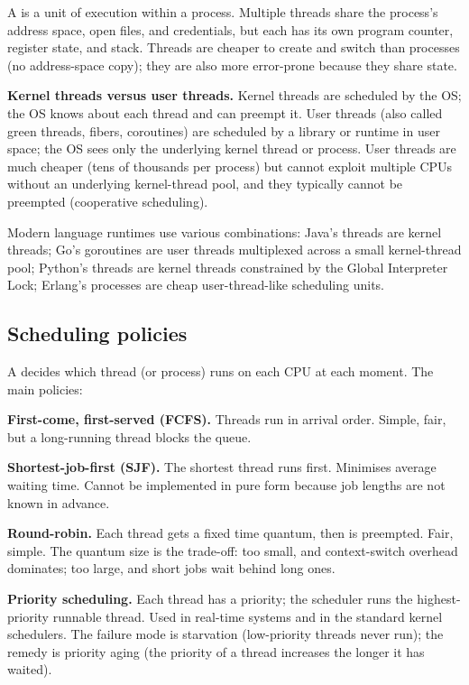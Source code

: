 A  is a unit of execution within a process. Multiple threads share the process's address space, open files, and credentials, but each has its own program counter, register state, and stack. Threads are cheaper to create and switch than processes (no address-space copy); they are also more error-prone because they share state.

\textbf{Kernel threads versus user threads.} Kernel threads are scheduled by the OS; the OS knows about each thread and can preempt it. User threads (also called green threads, fibers, coroutines) are scheduled by a library or runtime in user space; the OS sees only the underlying kernel thread or process. User threads are much cheaper (tens of thousands per process) but cannot exploit multiple CPUs without an underlying kernel-thread pool, and they typically cannot be preempted (cooperative scheduling).

Modern language runtimes use various combinations: Java's threads are kernel threads; Go's goroutines are user threads multiplexed across a small kernel-thread pool; Python's threads are kernel threads constrained by the Global Interpreter Lock; Erlang's processes are cheap user-thread-like scheduling units.

\subsection{Scheduling policies}

A  decides which thread (or process) runs on each CPU at each moment. The main policies:

\textbf{First-come, first-served (FCFS).} Threads run in arrival order. Simple, fair, but a long-running thread blocks the queue.

\textbf{Shortest-job-first (SJF).} The shortest thread runs first. Minimises average waiting time. Cannot be implemented in pure form because job lengths are not known in advance.

\textbf{Round-robin.} Each thread gets a fixed time quantum, then is preempted. Fair, simple. The quantum size is the trade-off: too small, and context-switch overhead dominates; too large, and short jobs wait behind long ones.

\textbf{Priority scheduling.} Each thread has a priority; the scheduler runs the highest-priority runnable thread. Used in real-time systems and in the standard kernel schedulers. The failure mode is starvation (low-priority threads never run); the remedy is priority aging (the priority of a thread increases the longer it has waited).

